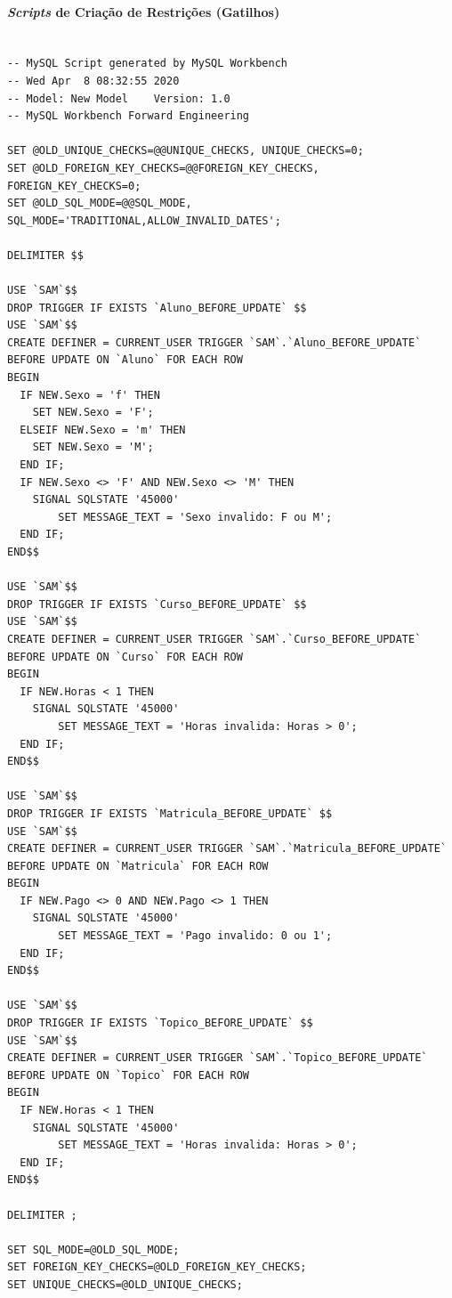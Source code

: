 \documentclass{article}
\begin{document}
\paragraph{\textit{Scripts} de Cria\c{c}\~ao de Restri\c{c}\~oes (Gatilhos)}


%
%
\begin{verbatim}

-- MySQL Script generated by MySQL Workbench
-- Wed Apr  8 08:32:55 2020
-- Model: New Model    Version: 1.0
-- MySQL Workbench Forward Engineering

SET @OLD_UNIQUE_CHECKS=@@UNIQUE_CHECKS, UNIQUE_CHECKS=0;
SET @OLD_FOREIGN_KEY_CHECKS=@@FOREIGN_KEY_CHECKS, FOREIGN_KEY_CHECKS=0;
SET @OLD_SQL_MODE=@@SQL_MODE, SQL_MODE='TRADITIONAL,ALLOW_INVALID_DATES';

DELIMITER $$

USE `SAM`$$
DROP TRIGGER IF EXISTS `Aluno_BEFORE_UPDATE` $$
USE `SAM`$$
CREATE DEFINER = CURRENT_USER TRIGGER `SAM`.`Aluno_BEFORE_UPDATE` BEFORE UPDATE ON `Aluno` FOR EACH ROW
BEGIN
  IF NEW.Sexo = 'f' THEN
	SET NEW.Sexo = 'F';
  ELSEIF NEW.Sexo = 'm' THEN
	SET NEW.Sexo = 'M';
  END IF;
  IF NEW.Sexo <> 'F' AND NEW.Sexo <> 'M' THEN
    SIGNAL SQLSTATE '45000'
        SET MESSAGE_TEXT = 'Sexo invalido: F ou M';
  END IF;
END$$

USE `SAM`$$
DROP TRIGGER IF EXISTS `Curso_BEFORE_UPDATE` $$
USE `SAM`$$
CREATE DEFINER = CURRENT_USER TRIGGER `SAM`.`Curso_BEFORE_UPDATE` BEFORE UPDATE ON `Curso` FOR EACH ROW
BEGIN
  IF NEW.Horas < 1 THEN
    SIGNAL SQLSTATE '45000'
        SET MESSAGE_TEXT = 'Horas invalida: Horas > 0';
  END IF;
END$$

USE `SAM`$$
DROP TRIGGER IF EXISTS `Matricula_BEFORE_UPDATE` $$
USE `SAM`$$
CREATE DEFINER = CURRENT_USER TRIGGER `SAM`.`Matricula_BEFORE_UPDATE` BEFORE UPDATE ON `Matricula` FOR EACH ROW
BEGIN
  IF NEW.Pago <> 0 AND NEW.Pago <> 1 THEN
    SIGNAL SQLSTATE '45000'
        SET MESSAGE_TEXT = 'Pago invalido: 0 ou 1';
  END IF;
END$$

USE `SAM`$$
DROP TRIGGER IF EXISTS `Topico_BEFORE_UPDATE` $$
USE `SAM`$$
CREATE DEFINER = CURRENT_USER TRIGGER `SAM`.`Topico_BEFORE_UPDATE` BEFORE UPDATE ON `Topico` FOR EACH ROW
BEGIN
  IF NEW.Horas < 1 THEN
    SIGNAL SQLSTATE '45000'
        SET MESSAGE_TEXT = 'Horas invalida: Horas > 0';
  END IF;
END$$

DELIMITER ;

SET SQL_MODE=@OLD_SQL_MODE;
SET FOREIGN_KEY_CHECKS=@OLD_FOREIGN_KEY_CHECKS;
SET UNIQUE_CHECKS=@OLD_UNIQUE_CHECKS;

\end{verbatim}
\end{document}
